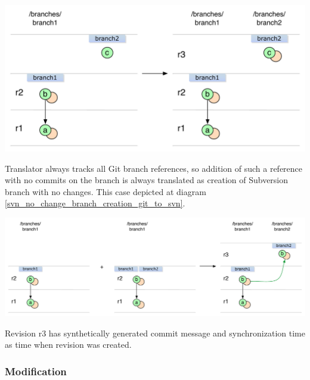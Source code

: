 \begin{center}
\includegraphics[width=\textwidth]{img/diagrams/branch_creation_no_history_git_to_svn.pdf}%
\label{branch_creation_no_history_git_to_svn}%
\end{center}

Translator always tracks all Git branch references, so addition of such a reference with no commits on the branch is always translated as creation of Subversion branch with no changes. This case depicted at diagram \ref{svn_no_change_branch_creation_git_to_svn}.
\begin{center}
\includegraphics[width=\textwidth]{img/diagrams/svn_no_change_branch_creation_git_to_svn.pdf}%
\label{svn_no_change_branch_creation_git_to_svn}%
\end{center}

Revision r3 has synthetically generated commit message and synchronization time as time when revision was created.

\subsubsection{Modification}

